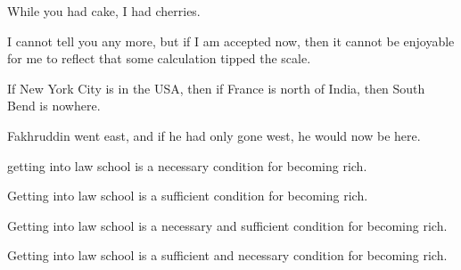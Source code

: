 \begin{enumerate}
\begin{statement}{While you had cake, I had cherries.}
\end{statement}

\begin{statement}{I cannot tell you any more, but if I am accepted now, then it cannot be enjoyable for me to reflect that some calculation tipped the scale.}
\end{statement}

\begin{statement}{If New York City is in the USA, then if France is north of India, then South Bend is nowhere.}
\end{statement}

\begin{statement}{Fakhruddin went east, and if he had only gone west, he would now be here.}
\end{statement}

\begin{statement}{getting into law school is a necessary condition for becoming rich.}
\end{statement}

\begin{statement}{Getting into law school is a sufficient condition for becoming rich.}
\end{statement}

\begin{statement}{Getting into law school is a necessary and sufficient condition for becoming rich.}
\end{statement}

\begin{statement}{Getting into law school is a sufficient and necessary condition for becoming rich.}
\end{statement}


\end{enumerate}
